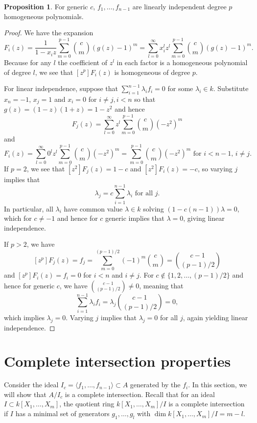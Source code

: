 \documentclass{elsarticle}
\numberwithin{equation}{section}
\theoremstyle{definition}
\newtheorem{proposition}[theorem]{Proposition}
\begin{document}
\begin{proposition}\label{prop:linind} 
For generic $c$, $f_1, \ldots, f_{n - 1}$ are linearly independent degree $p$ homogeneous polynomials.
\end{proposition} 
\begin{proof} 
We have the expansion
\[
F_i(z)=\frac{1}{1-x_iz}\sum_{m=0}^{p-1} \binom{c}{m} (g(z)-1)^m=\sum_{l=0}^\infty x_i^lz^l\sum_{m=0}^{p-1} \binom{c}{m} (g(z)-1)^m.
\]
Because for any $l$ the coefficient of $z^l$ in each factor is a homogeneous polynomial of degree $l$, we see that $[z^p]F_i(z)$ is homogeneous of degree $p$.

For linear independence, suppose that $\sum_{i=1}^{n-1} \lambda_if_i=0$ for some $\lambda_i \in k$.  Substitute $x_{n} = -1$, $x_j=1$ and $x_i=0$ for $i \ne j,i < n$ so that $g(z)=(1-z)(1+z)=1-z^2$ and hence
\[
F_j(z)=\sum_{l=0}^\infty z^l\sum_{m=0}^{p-1} \binom{c}{m} (-z^2)^m
\]
and 
\[
F_i(z)=\sum_{l=0}^\infty 0^lz^l\sum_{m=0}^{p-1} \binom{c}{m} (-z^2)^m=\sum_{m=0}^{p-1} \binom{c}{m} (-z^2)^m \text{ for $i < n - 1$, $i \neq j$}.
\]
If $p = 2$, we see that $[z^2]F_j(z)=1-c$ and $[z^2]F_i(z)=-c$, so varying $j$ implies that
\[
\lambda_j = c\sum_{i=1}^{n-1} \lambda_i \text{ for all }j.
\]
In particular, all $\lambda_i$ have common value $\lambda \in k$ solving $(1-c(n-1))\lambda = 0$, which for $c \ne -1$ and hence for $c$ generic implies that $\lambda = 0$, giving linear independence. 

If $p > 2$, we have 
\[
[z^p]F_j(z)=f_j=\sum_{m=0}^{(p-1)/2} (-1)^m\binom{c}{m}=\binom{c-1}{(p-1)/2}
\]
and $[z^p]F_i(z)=f_i=0$ for $i < n$ and $i \neq j$. For $c \notin \{1,2,\dots,(p-1)/2\}$ and hence for generic $c$, we have $\binom{c-1}{(p-1)/2} \ne 0$, meaning that 
\[
\sum_{i=1}^{n-1} \lambda_if_i = \lambda_j\binom{c-1}{(p-1)/2}=0,
\]
which implies $\lambda_j=0$.  Varying $j$ implies that $\lambda_j=0$ for all $j$, again yielding linear independence.
\end{proof}

\section{Complete intersection properties}

Consider the ideal $I_c = \langle f_1, \ldots, f_{n - 1} \rangle \subset A$ generated by the $f_i$.  In this section, we will show that $A/I_c$ is a complete intersection.  Recall that for an ideal $I \subset k[X_1,\dots,X_m]$, the quotient ring $k[X_1,\dots,X_m]/I$ is a complete intersection if $I$ has a minimal set of generators $g_1, \ldots, g_l$ with $\dim k[X_1,\dots,X_m]/I = m - l$.
\end{document}
